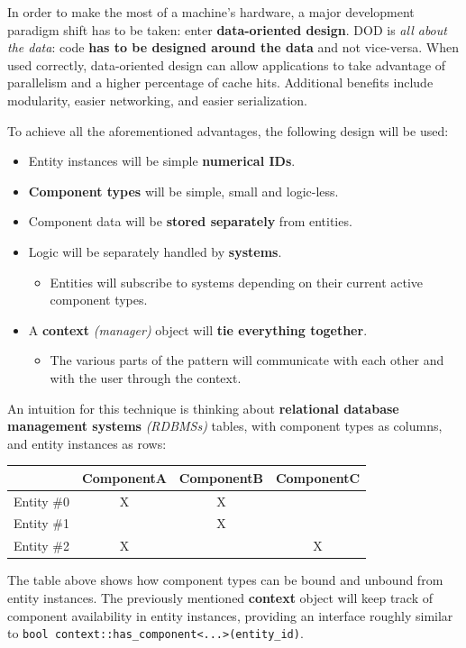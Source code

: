 \documentclass[twoside, 12pt, a4paper, openany]{book}
\providecommand{\tightlist}{%
  \setlength{\itemsep}{0pt}\setlength{\parskip}{0pt}}
\begin{document}
In order to make the most of a machine's hardware, a major development
paradigm shift has to be taken: enter \textbf{data-oriented design}. DOD
is \emph{all about the data}: code \textbf{has to be designed around the
data} and not vice-versa. When used correctly, data-oriented design can
allow applications to take advantage of parallelism and a higher
percentage of cache hits. Additional benefits include modularity, easier
networking, and easier serialization.

To achieve all the aforementioned advantages, the following design will
be used:

\begin{itemize}
\item
  Entity instances will be simple \textbf{numerical IDs}.
\item
  \textbf{Component types} will be simple, small and logic-less.
\item
  Component data will be \textbf{stored separately} from entities.
\item
  Logic will be separately handled by \textbf{systems}.

  \begin{itemize}
  \tightlist
  \item
    Entities will subscribe to systems depending on their current active
    component types.
  \end{itemize}
\item
  A \textbf{context} \emph{(manager)} object will \textbf{tie everything
  together}.

  \begin{itemize}
  \tightlist
  \item
    The various parts of the pattern will communicate with each other
    and with the user through the context.
  \end{itemize}
\end{itemize}

An intuition for this technique is thinking about \textbf{relational
database management systems} \emph{(RDBMSs)} tables, with component
types as columns, and entity instances as rows:

\begin{longtable}[]{@{}lccc@{}}
\toprule
& ComponentA & ComponentB & ComponentC\tabularnewline
\midrule
\endhead
Entity \#0 & X & X &\tabularnewline
Entity \#1 & & X &\tabularnewline
Entity \#2 & X & & X\tabularnewline
\bottomrule
\end{longtable}

The table above shows how component types can be bound and unbound from
entity instances. The previously mentioned \textbf{context} object will
keep track of component availability in entity instances, providing an
interface roughly similar to
\texttt{bool context::has_component<...>(entity_id)}.
\end{document}
